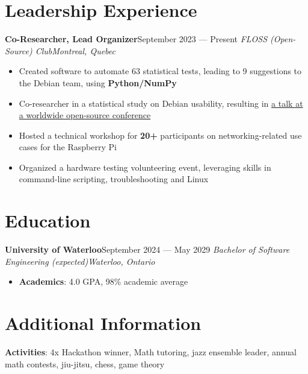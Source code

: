 \documentclass{article}
\newcommand{\newrole}[4]{
    {\normalfont\textbf{#1}\hfill#3}
    \newline
    \textit{#2}\hfill\textit{#4}
}
\newenvironment{bulletpoints}{\begin{itemize}\setlength\itemsep{-0.2em}}{\end{itemize}}
\begin{document}
\section*{Leadership Experience}
\newrole{Co-Researcher, Lead Organizer}{FLOSS (Open-Source) Club}{September 2023 --- Present}{Montreal, Quebec}
\begin{bulletpoints}
    \item Created software to automate 63 statistical tests, leading to 9 suggestions to the Debian team, using \textbf{Python/NumPy}
    \item Co-researcher in a statistical study on Debian usability, resulting in \href{https://debconf24.debconf.org/talks/49-debian-installer-usability-tests-take-2/}{a talk at a worldwide open-source conference\;\faExternalLink}
    \item Hosted a technical workshop for \textbf{20+} participants on networking-related use cases for the Raspberry Pi
    \item Organized a hardware testing volunteering event, leveraging skills in command-line scripting, troubleshooting and Linux
\end{bulletpoints}

\section*{Education}

\newrole{University of Waterloo}{Bachelor of Software Engineering (expected)}{September 2024 --- May 2029}{Waterloo, Ontario}
\begin{bulletpoints}
    \vspace*{-2pt}
    \item {\bfseries Academics}: 4.0 GPA, 98\% academic average
\end{bulletpoints}

\section*{Additional Information}
{\bfseries Activities}: 4x Hackathon winner, Math tutoring, jazz ensemble leader, annual math contests, jiu-jitsu, chess, game theory
\end{document}
